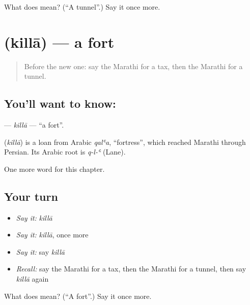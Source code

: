 \begin{tcolorbox}[breakable,colback=teal!4,colframe=teal!35!black,title={Before you move on}]
What does  mean? (\textquotedblleft{}A tunnel\textquotedblright{}.) Say it once more.
\end{tcolorbox}
\section[\texorpdfstring{\mr{किल्ला} (killā)}{किल्ला (killā)}]{ (killā) — a fort}

\label{lesson:MR-C183-killa}



\begin{quote}
Before the new one: say the Marathi for a tax, then the Marathi for a tunnel.
\end{quote}

\subsection*{You'll want to know: }
\textbf{} — \emph{killā} — \textquotedblleft{}a fort\textquotedblright{}.

\begin{cousinweb}
\textbf{} (\emph{killā}) is a loan from Arabic \emph{qalʿa}, \textquotedblleft{}fortress\textquotedblright{}, which reached Marathi through Persian. Its Arabic root is \emph{q-l-ʿ} (Lane).
\end{cousinweb}

\begin{grammarlens}[title={What you've built}]
One more word for this chapter.
\end{grammarlens}

\subsection*{Your turn}
\begin{itemize}
\raggedright
  \item \emph{Say it:} \emph{killā}
  \item \emph{Say it:} \emph{killā}, once more
  \item \emph{Say it:} say \emph{killā}
  \item \emph{Recall:} say the Marathi for a tax, then the Marathi for a tunnel, then say \emph{killā} again
\end{itemize}

\begin{tcolorbox}[breakable,colback=teal!4,colframe=teal!35!black,title={Before you move on}]
What does  mean? (\textquotedblleft{}A fort\textquotedblright{}.) Say it once more.
\end{tcolorbox}
